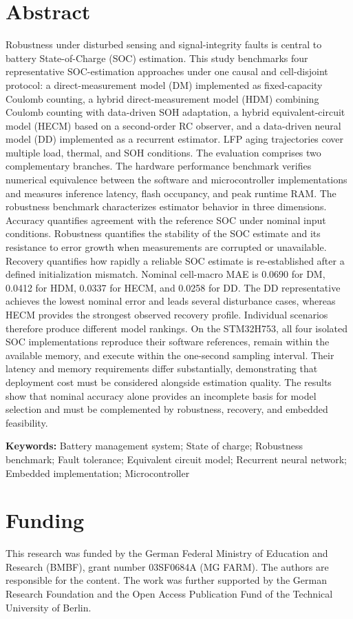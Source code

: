 \documentclass[11pt,a4paper]{article}
\begin{document}
\section*{Abstract}
Robustness under disturbed sensing and signal-integrity faults is central to battery State-of-Charge (SOC) estimation. This study benchmarks four representative SOC-estimation approaches under one causal and cell-disjoint protocol: a direct-measurement model (DM) implemented as fixed-capacity Coulomb counting, a hybrid direct-measurement model (HDM) combining Coulomb counting with data-driven SOH adaptation, a hybrid equivalent-circuit model (HECM) based on a second-order RC observer, and a data-driven neural model (DD) implemented as a recurrent estimator. LFP aging trajectories cover multiple load, thermal, and SOH conditions. The evaluation comprises two complementary branches. The hardware performance benchmark verifies numerical equivalence between the software and microcontroller implementations and measures inference latency, flash occupancy, and peak runtime RAM. The robustness benchmark characterizes estimator behavior in three dimensions. Accuracy quantifies agreement with the reference SOC under nominal input conditions. Robustness quantifies the stability of the SOC estimate and its resistance to error growth when measurements are corrupted or unavailable. Recovery quantifies how rapidly a reliable SOC estimate is re-established after a defined initialization mismatch. Nominal cell-macro MAE is 0.0690 for DM, 0.0412 for HDM, 0.0337 for HECM, and 0.0258 for DD. The DD representative achieves the lowest nominal error and leads several disturbance cases, whereas HECM provides the strongest observed recovery profile. Individual scenarios therefore produce different model rankings. On the STM32H753, all four isolated SOC implementations reproduce their software references, remain within the available memory, and execute within the one-second sampling interval. Their latency and memory requirements differ substantially, demonstrating that deployment cost must be considered alongside estimation quality. The results show that nominal accuracy alone provides an incomplete basis for model selection and must be complemented by robustness, recovery, and embedded feasibility.

\textbf{Keywords:} Battery management system; State of charge; Robustness benchmark; Fault tolerance; Equivalent circuit model; Recurrent neural network; Embedded implementation; Microcontroller

\section*{Funding}
This research was funded by the German Federal Ministry of Education and Research (BMBF), grant number 03SF0684A (MG FARM). The authors are responsible for the content. The work was further supported by the German Research Foundation and the Open Access Publication Fund of the Technical University of Berlin.
\end{document}

